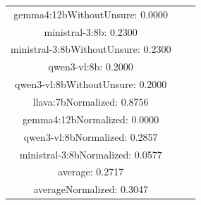 \documentclass[a4paper]{article}
\begin{document}
\begin{tabular}{ccc}
gemma4:12bWithoutUnsure: 0.0000 \\ ministral-3:8b: 0.2300 \\ ministral-3:8bWithoutUnsure: 0.2300 \\ qwen3-vl:8b: 0.2000 \\ qwen3-vl:8bWithoutUnsure: 0.2000 \\ llava:7bNormalized: 0.8756 \\ gemma4:12bNormalized: 0.0000 \\ qwen3-vl:8bNormalized: 0.2857 \\ ministral-3:8bNormalized: 0.0577 \\ average: 0.2717 \\ averageNormalized: 0.3047 \end{minipage}\\
\end{tabular}

\vspace{5mm}
\end{document}

